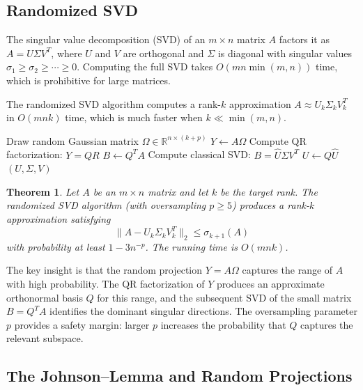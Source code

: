 \documentclass[twoside,12pt]{book}
\theoremstyle{plain}
\newtheorem{theorem}{Theorem}[chapter]
\theoremstyle{definition}
\theoremstyle{remark}
\begin{document}
\subsection{Randomized SVD}

The singular value decomposition (SVD) of an $m \times n$ matrix $A$ factors it as $A = U \Sigma V^T$, where $U$ and $V$ are orthogonal and $\Sigma$ is diagonal with singular values $\sigma_1 \geq \sigma_2 \geq \cdots \geq 0$. Computing the full SVD takes $O(m n \min(m,n))$ time, which is prohibitive for large matrices.

The randomized SVD algorithm computes a rank-$k$ approximation $A \approx U_k \Sigma_k V_k^T$ in $O(m n k)$ time, which is much faster when $k \ll \min(m,n)$.

\begin{algorithm}[htbp]
\caption{Randomized SVD}
\label{alg:rand-svd}
\begin{algorithmic}[1]
  \State Draw random Gaussian matrix $\Omega \in \mathbb{R}^{n \times (k+p)}$
  \State $Y \gets A \Omega$ 
  \State Compute QR factorization: $Y = Q R$
  \State $B \gets Q^T A$ 
  \State Compute classical SVD: $B = \hat{U} \Sigma V^T$
  \State $U \gets Q \hat{U}$
  \State \Return $(U, \Sigma, V)$
\EndFunction
\end{algorithmic}
\end{algorithm}

\begin{theorem}\label{thm:rand-svd}
Let $A$ be an $m \times n$ matrix and let $k$ be the target rank. The randomized SVD algorithm (with oversampling $p \geq 5$) produces a rank-$k$ approximation satisfying
\[
\|A - U_k \Sigma_k V_k^T\|_2 \leq \sigma_{k+1}(A)
\]
with probability at least $1 - 3 n^{-p}$. The running time is $O(m n k)$.
\end{theorem}

The key insight is that the random projection $Y = A\Omega$ captures the range of $A$ with high probability. The QR factorization of $Y$ produces an approximate orthonormal basis $Q$ for this range, and the subsequent SVD of the small matrix $B = Q^T A$ identifies the dominant singular directions. The oversampling parameter $p$ provides a safety margin: larger $p$ increases the probability that $Q$ captures the relevant subspace.

\subsection{The Johnson--Lemma and Random Projections}
\end{document}
